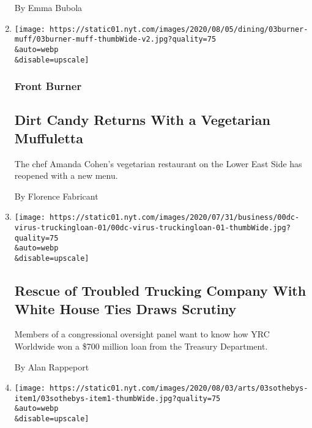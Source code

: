 \begin{enumerate}
  By Emma Bubola
\item
  \href{/2020/08/03/dining/dirt-candy-vegetarian-muffuletta.html}{}

  \texttt{[image: https://static01.nyt.com/images/2020/08/05/dining/03burner-muff/03burner-muff-thumbWide-v2.jpg?quality=75\\\&auto=webp\\\&disable=upscale]}

  \hypertarget{front-burner}{%
  \subsubsection{Front Burner}\label{front-burner}}

  \hypertarget{dirt-candy-returns-with-a-vegetarian-muffuletta}{%
  \subsection{Dirt Candy Returns With a Vegetarian
  Muffuletta}\label{dirt-candy-returns-with-a-vegetarian-muffuletta}}

  The chef Amanda Cohen's vegetarian restaurant on the Lower East Side
  has reopened with a new menu.

  By Florence Fabricant
\item
  \href{/2020/08/03/us/politics/yrc-coronavirus-relief-funds.html}{}

  \texttt{[image: https://static01.nyt.com/images/2020/07/31/business/00dc-virus-truckingloan-01/00dc-virus-truckingloan-01-thumbWide.jpg?quality=75\\\&auto=webp\\\&disable=upscale]}

  \hypertarget{rescue-of-troubled-trucking-company-with-white-house-ties-draws-scrutiny}{%
  \subsection{Rescue of Troubled Trucking Company With White House Ties
  Draws
  Scrutiny}\label{rescue-of-troubled-trucking-company-with-white-house-ties-draws-scrutiny}}

  Members of a congressional oversight panel want to know how YRC
  Worldwide won a \$700 million loan from the Treasury Department.

  By Alan Rappeport
\item
  \href{/2020/08/03/arts/design/sothebys-sales.html}{}

  \texttt{[image: https://static01.nyt.com/images/2020/08/03/arts/03sothebys-item1/03sothebys-item1-thumbWide.jpg?quality=75\\\&auto=webp\\\&disable=upscale]}

  \hypertarget{sothebys-reports-25-billion-in-sales}{%
}
\end{enumerate}
